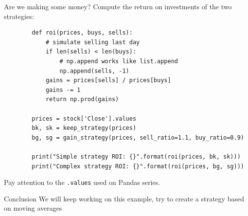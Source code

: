 \documentclass[aspectratio=169,]{beamer}
\begin{document}
\begin{frame}[fragile]{Are we making some money?}
    Compute the return on investments of the two strategies:

    \begin{verbatim}
        def roi(prices, buys, sells):
            # simulate selling last day
            if len(sells) < len(buys):
                # np.append works like list.append
                np.append(sells, -1)
            gains = prices[sells] / prices[buys]
            gains -= 1
            return np.prod(gains)

        prices = stock['Close'].values
        bk, sk = keep_strategy(prices)
        bg, sg = gain_strategy(prices, sell_ratio=1.1, buy_ratio=0.9)

        print("Simple strategy ROI: {}".format(roi(prices, bk, sk)))
        print("Complex strategy ROI: {}".format(roi(prices, bg, sg)))
    \end{verbatim}

    Pay attention to the \texttt{.values} used on Pandas series.
\end{frame}

\begin{frame}{Conclusion}
    We will keep working on this example, try to create a strategy based on moving averages
\end{frame}
\end{document}
